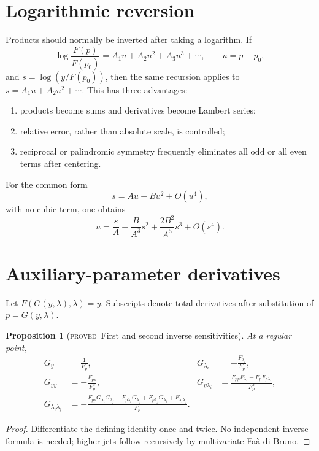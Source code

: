 \documentclass[11pt,letterpaper,oneside,openany]{book}
\newtheorem{proposition}[theorem]{Proposition}
\theoremstyle{definition}
\theoremstyle{remark}
\newcommand{\statusproved}{\textcolor{provedgreen}{\textsc{proved}}}
\begin{document}
\section{Logarithmic reversion}
Products should normally be inverted after taking a logarithm.  If
\[
 \log\frac{F(p)}{F(p_0)}=A_1u+A_2u^2+A_3u^3+\cdots,
 \qquad u=p-p_0,
\]
and \(s=\log(y/F(p_0))\), then the same recursion applies to
\(s=A_1u+A_2u^2+\cdots\).  This has three advantages:
\begin{enumerate}[label=(\alph*)]
\item products become sums and derivatives become Lambert series;
\item relative error, rather than absolute scale, is controlled;
\item reciprocal or palindromic symmetry frequently eliminates all odd or all
even terms after centering.
\end{enumerate}

For the common form
\[
 s=A u+B u^2+O(u^4),
\]
with no cubic term, one obtains
\[
 u=\frac{s}{A}-\frac{B}{A^3}s^2+\frac{2B^2}{A^5}s^3+O(s^4).
\]

\section{Auxiliary-parameter derivatives}
Let \(F(G(y,\lambda),\lambda)=y\).  Subscripts denote total derivatives after
substitution of \(p=G(y,\lambda)\).

\begin{proposition}[\statusproved\ First and second inverse sensitivities]
At a regular point,
\begin{align*}
 G_y&=\frac1{F_p},&
 G_{\lambda_i}&=-\frac{F_{\lambda_i}}{F_p},\\
 G_{yy}&=-\frac{F_{pp}}{F_p^3},&
 G_{y\lambda_i}&=\frac{F_{pp}F_{\lambda_i}-F_pF_{p\lambda_i}}{F_p^3},\\
 G_{\lambda_i\lambda_j}
 &=-\frac{F_{pp}G_{\lambda_i}G_{\lambda_j}
 +F_{p\lambda_i}G_{\lambda_j}+F_{p\lambda_j}G_{\lambda_i}
 +F_{\lambda_i\lambda_j}}{F_p}.
\end{align*}
\end{proposition}
\begin{proof}
Differentiate the defining identity once and twice.  No independent inverse
formula is needed; higher jets follow recursively by multivariate
Fa\`a di Bruno.
\end{proof}
\end{document}
